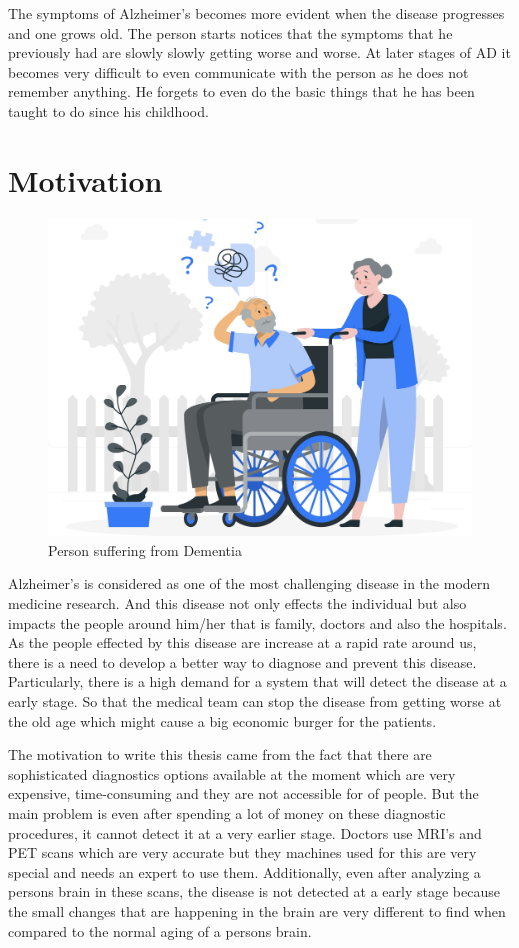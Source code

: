 \documentclass[12pt,onecolumn]{report}
\begin{document}
The symptoms of Alzheimer's becomes more evident when the disease progresses and one grows old. The person starts notices that the symptoms that he previously had are slowly slowly getting worse and worse. At later stages of AD it becomes very difficult to even communicate with the person as he does not remember anything. He forgets to even do the basic things that he has been taught to do since his childhood.

\chapter{Motivation}

\begin{figure}[h!]
    \centering
    \includegraphics[width=0.8\columnwidth]{figures/fig2.jpeg}  %
    \caption{Person suffering from Dementia} %
    \label{fig:alzheimers_patient} %
\end{figure}

Alzheimer's is considered as one of the most challenging disease in the modern medicine research. And this disease not only effects the individual but also impacts the people around him/her that is family, doctors and also the hospitals. As the people effected by this disease are increase at a rapid rate around us, there is a need to develop a better way to diagnose and prevent this disease. Particularly, there is a high demand for a system that will detect the disease at a early stage. So that the medical team can stop the disease from getting worse at the old age which might cause a big economic burger for the patients.

The motivation to write this thesis came from the fact that there are sophisticated diagnostics options available at the moment which are very expensive, time-consuming and they are not accessible for of people. But the main problem is even after spending a lot of money on these diagnostic procedures, it cannot detect it at a very earlier stage. Doctors use MRI's and PET scans which are very accurate but they machines used for this are very special and needs an expert to use them. Additionally, even after analyzing a persons brain in these scans, the disease is not detected at a early stage because the small changes that are happening in the brain are very different to find when compared to the normal aging of a persons brain. 
\end{document}
